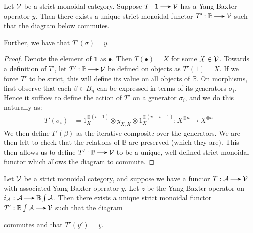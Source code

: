 \begin{lemma}
    Let $\mathcal{V}$ be a strict monoidal category. 
    Suppose $T: \textbf{1} \to \vv$ has a Yang-Baxter operator
    $y$. Then there exists a
    unique strict monoidal functor $T': \mathbb{B} \to \vv$ such that the diagram below commutes. 
    \begin{center}
    \end{center}
    Further, we have that $T'(\sigma) = y$.
\end{lemma}

\begin{proof}
    Denote the element of $\mathbf{1}$ as $\bullet$. Then
    $T(\bullet) = X$ for some $X \in \mathcal{V}$. Towards a definition of $T'$, let 
    $T': \mathbb{B} \to \vv$ 
    be defined on objects as $T'(1) = X$. If we force $T'$ to be strict, 
    this will define its value on all objects of 
    $\mathbb{B}$. On morphisms, first observe that 
    each $\beta \in B_n$ can be expressed in terms of its 
    generators $\sigma_i$. Hence it suffices to define the action of 
    $T'$ on a generator $\sigma_i$, and we do this naturally as:
    \begin{align*}
        T'(\sigma_i) &= 1_X^{\otimes(i-1)}\otimes y_{X,X}\otimes 1_X^{\otimes(n-i-1)}: X^{\otimes n} \to X^{\otimes n}
    \end{align*}
    We then define $T'(\beta)$ as the iterative composite over the generators. 
    We are then left to check that the relations of $\mathbb{B}$ are preserved (which they are). 
    This then allows us to define $T': \mathbb{B} \to \vv$ to be a unique, well defined strict 
    monoidal functor which allows the diagram to commute.
\end{proof}

\begin{proposition}\label{proposition:triangle_commutes}
    Let $\mathcal{V}$ be a strict monoidal category, and suppose we have a
    functor $T: \aa \to \vv$ with associated Yang-Baxter operator
    $y$. Let $z$ be the Yang-Baxter operator on $i_{\aa}: \aa \to \mathbb{B}\int\aa$.
    Then there exists a unique strict monoidal functor $T': \mathbb{B}\int\aa \to \vv$ such that the diagram
    \begin{center}

    \end{center}
    commutes and that $T'(y') = y$. 
\end{proposition}

